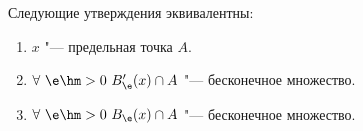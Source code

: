 \label{hal}
Следующие утверждения эквивалентны:
\begin{enumerate}
    \item $x$ "--- предельная точка $A$.
    \item $\forall\  \e\hm>0\ B'_\e(x)\cap A$ "--- бесконечное множество.
    \item $\forall\  \e\hm>0\ B_\e(x)\cap A$ "--- бесконечное множество.
\end{enumerate}
 
